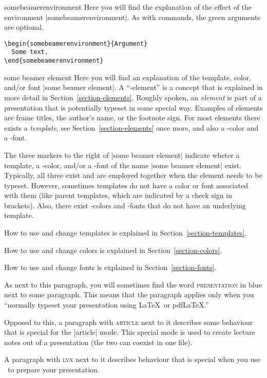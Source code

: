\begin{environment}{{somebeamerenvironment}}
  Here you will find the explanation of the effect of the environment
  |somebeamerenvironment|. As with commands, the green arguments are
  optional.

  \example
\begin{verbatim}
\begin{somebeamerenvironment}{Argument}
  Some text.
\end{somebeamerenvironment}
\end{verbatim}
\end{environment}

\begin{element}{some beamer element}\yes\yes\yes
  Here you will find an explanation of the template, color,
  and/or font |some beamer element|.
  A ``\beamer-element'' is a concept that is explained in more detail
  in Section~\ref{section-elements}. Roughly spoken, an \emph{element}
  is part of a presentation that is potentially typeset in some
  special way. Examples of elements are frame titles, the author's
  name, or the footnote sign. For most elements there exists a
  \emph{template}, see Section~\ref{section-elements} once more, and
  also a \beamer-color and a \beamer-font.

  The three markers to the right of |some beamer element| indicate
  wheter a template, a \beamer-color, and/or a \beamer-font of the
  name |some beamer element| exist. Typically, all three exist and are
  employed together when the element needs to be typeset. However,
  sometimes templates do not have a color or font associated with them
  (like parent templates, which are indicated by a check sign in
  brackets). Also, there exist \beamer-colors and -fonts that do not
  have an underlying template.

  How to use and change templates is explained in
  Section~\ref{section-templates}.

  How to use and change colors is explained in
  Section~\ref{section-colors}.

  How to use and change fonts is explained in
  Section~\ref{section-fonts}. 
\end{element}


\beamernote
As next to this paragraph, you will sometimes find the word
\textsc{presentation} in blue next to some paragraph. This means that
the paragraph applies only when you ``normally typeset your
presentation using \LaTeX\ or pdf\LaTeX.''

\articlenote
Opposed to this, a paragraph with \textsc{article} next to it
describes some behaviour that is special for the |article| mode. This
special mode is used to create lecture notes out of a presentation
(the two can coexist in one file).

\lyxnote
A paragraph with \textsc{lyx} next to it describes behaviour that is
special when you use \LyX\ to prepare your presentation.



